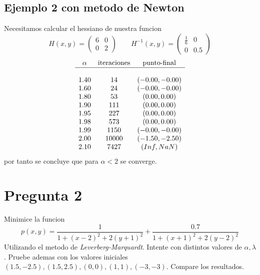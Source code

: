 \documentclass[letterpaper]{article}
\begin{document}
\subsection*{Ejemplo 2 con metodo de Newton}
\noindent Necesitamos calcular el hessiano de nuestra funcion
\[ H(x,y) =
  \begin{pmatrix}
    6 & 0 \\
    0 & 2
  \end{pmatrix}
  \qquad
  H^{-1}(x,y) =
  \begin{pmatrix}
    \frac{1}{6} & 0 \\
    0 & 0.5
  \end{pmatrix}
\]
\[
\begin{array}{c c c}
  \alpha & \text{iteraciones} & \text{punto-final} \\
  \hline \\
  1.40 & 14    & (-0.00, -0.00) \\
  1.60 & 24    & (-0.00, -0.00) \\
  1.80 & 53    & (0.00, 0.00)   \\
  1.90 & 111   & (0.00, 0.00)   \\
  1.95 & 227   & (0.00, 0.00)   \\
  1.98 & 573   & (0.00, 0.00)   \\
  1.99 & 1150  & (-0.00, -0.00) \\
  2.00 & 10000 & (-1.50, -2.50) \\
  2.10 & 7427  & (Inf, NaN)     \\
\end{array}
\]
por tanto se concluye que para \(\alpha < 2\) se converge.

\section*{Pregunta 2}
\noindent Minimice la funcion
\[ p(x,y) = \frac{1}{1 + (x-2)^2 + 2 (y+1)^2} + \frac{0.7}{1 + (x+1)^2 +
    2 (y - 2)^2 } \]
Utilizando el metodo de \emph{Leverberg-Marquardt}. Intente con distintos
valores de \(\alpha, \lambda\). Pruebe ademas con los valores iniciales
\((1.5, -2.5), (1.5, 2.5), (0,0), (1,1), (-3,-3)\). Compare los resultados.
\newline
\end{document}
